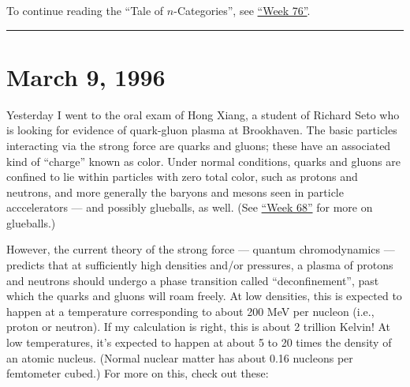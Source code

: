 \documentclass{article}
\renewcommand{\texttt}[1]{%
  \begingroup
  \ttfamily
  \begingroup\lccode`~=`/\lowercase{\endgroup\def~}{/\discretionary{}{}{}}%
  \begingroup\lccode`~=`[\lowercase{\endgroup\def~}{[\discretionary{}{}{}}%
  \begingroup\lccode`~=`.\lowercase{\endgroup\def~}{.\discretionary{}{}{}}%
  \catcode`/=\active\catcode`[=\active\catcode`.=\active
  \scantokens{#1\noexpand}%
  \endgroup
}
\begin{document}
To continue reading the ``Tale of \(n\)-Categories'', see
\protect\hyperlink{week76}{``Week 76''}.

\begin{center}\rule{0.5\linewidth}{0.5pt}\end{center}



\hypertarget{week76}{%
\section{March 9, 1996}\label{week76}}

Yesterday I went to the oral exam of Hong Xiang, a student of Richard
Seto who is looking for evidence of quark-gluon plasma at Brookhaven.
The basic particles interacting via the strong force are quarks and
gluons; these have an associated kind of ``charge'' known as color.
Under normal conditions, quarks and gluons are confined to lie within
particles with zero total color, such as protons and neutrons, and more
generally the baryons and mesons seen in particle acccelerators --- and
possibly glueballs, as well. (See \protect\hyperlink{week68}{``Week
68''} for more on glueballs.)

However, the current theory of the strong force --- quantum
chromodynamics --- predicts that at sufficiently high densities and/or
pressures, a plasma of protons and neutrons should undergo a phase
transition called ``deconfinement'', past which the quarks and gluons
will roam freely. At low densities, this is expected to happen at a
temperature corresponding to about 200 MeV per nucleon (i.e., proton or
neutron). If my calculation is right, this is about 2 trillion Kelvin!
At low temperatures, it's expected to happen at about 5 to 20 times the
density of an atomic nucleus. (Normal nuclear matter has about 0.16
nucleons per femtometer cubed.) For more on this, check out these:

\end{document}
